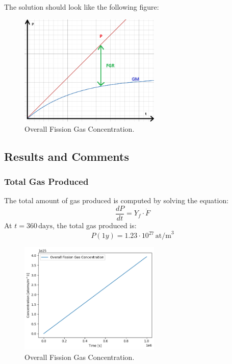 The solution should look like the following figure:
\begin{figure}
    \centering
    \includegraphics[width=0.6\textwidth]{FGR_plot.png}
    \caption{Overall Fission Gas Concentration.}
    \label{fig:FGR_plot}
\end{figure}

\subsection{Results and Comments}

\subsubsection{Total Gas Produced}

The total amount of gas produced is computed by solving the equation:
\begin{equation}
    \frac{dP}{dt} = Y_f \cdot \dot{F}
\end{equation}
At $t = 360 \, \text{days}$, the total gas produced is:
\[
P(1y) = 1.23 \cdot 10^{27} \, \text{at/m}^3
\]

\begin{figure}[H]
    \centering
    \includegraphics[width=0.6\textwidth]{FGR_1.png}
    \caption{Overall Fission Gas Concentration.}
    \label{fig:FGR_1}
\end{figure}

